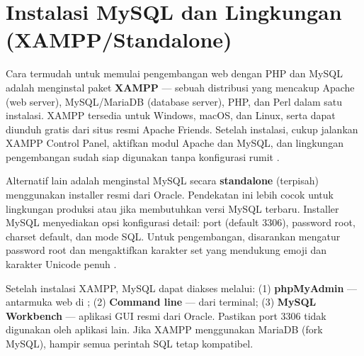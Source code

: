 \section{Instalasi MySQL dan Lingkungan (XAMPP/Standalone)}

Cara termudah untuk memulai pengembangan web dengan PHP dan MySQL adalah menginstal paket \textbf{XAMPP} --- sebuah distribusi yang mencakup Apache (web server), MySQL/MariaDB (database server), PHP, dan Perl dalam satu instalasi. XAMPP tersedia untuk Windows, macOS, dan Linux, serta dapat diunduh gratis dari situs resmi Apache Friends. Setelah instalasi, cukup jalankan XAMPP Control Panel, aktifkan modul Apache dan MySQL, dan lingkungan pengembangan sudah siap digunakan tanpa konfigurasi rumit \cite{mysqlGettingStarted}.

Alternatif lain adalah menginstal MySQL secara \textbf{standalone} (terpisah) menggunakan installer resmi dari Oracle. Pendekatan ini lebih cocok untuk lingkungan produksi atau jika membutuhkan versi MySQL terbaru. Installer MySQL menyediakan opsi konfigurasi detail: port (default 3306), password root, charset default, dan mode SQL. Untuk pengembangan, disarankan mengatur password root dan mengaktifkan karakter set  yang mendukung emoji dan karakter Unicode penuh \cite{mysqlDocs}.

\begin{catatan}
Setelah instalasi XAMPP, MySQL dapat diakses melalui: (1) \textbf{phpMyAdmin} --- antarmuka web di ; (2) \textbf{Command line} ---  dari terminal; (3) \textbf{MySQL Workbench} --- aplikasi GUI resmi dari Oracle. Pastikan port 3306 tidak digunakan oleh aplikasi lain. Jika XAMPP menggunakan MariaDB (fork MySQL), hampir semua perintah SQL tetap kompatibel.
\end{catatan}

